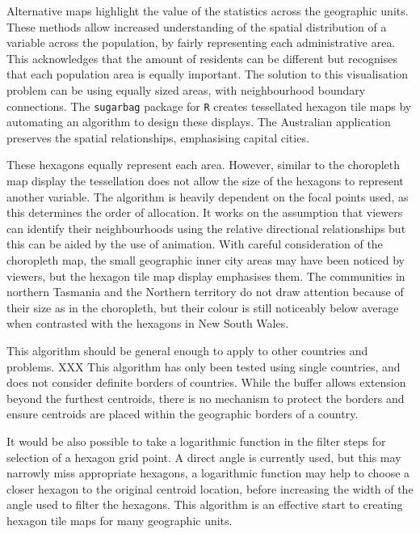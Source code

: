 Alternative maps highlight the value of the statistics across the
geographic units. These methods allow increased understanding of the
spatial distribution of a variable across the population, by fairly
representing each administrative area. This acknowledges that the amount
of residents can be different but recognises that each population area
is equally important. The solution to this visualisation problem can be
using equally sized areas, with neighbourhood boundary connections. The
\texttt{sugarbag} package for \texttt{R} creates tessellated hexagon
tile maps by automating an algorithm to design these displays. The
Australian application preserves the spatial relationships, emphasising
capital cities.

These hexagons equally represent each area. However, similar to the
choropleth map display the tessellation does not allow the size of the
hexagons to represent another variable. The algorithm is heavily
dependent on the focal points used, as this determines the order of
allocation. It works on the assumption that viewers can identify their
neighbourhoods using the relative directional relationships but this can
be aided by the use of animation. With careful consideration of the
choropleth map, the small geographic inner city areas may have been
noticed by viewers, but the hexagon tile map display emphasises them.
The communities in northern Tasmania and the Northern territory do not
draw attention because of their size as in the choropleth, but their
colour is still noticeably below average when contrasted with the
hexagons in New South Wales.

This algorithm should be general enough to apply to other countries and
problems. XXX This algorithm has only been tested using single
countries, and does not consider definite borders of countries. While
the buffer allows extension beyond the furthest centroids, there is no
mechanism to protect the borders and ensure centroids are placed within
the geographic borders of a country.

It would be also possible to take a logarithmic function in the filter
steps for selection of a hexagon grid point. A direct angle is currently
used, but this may narrowly miss appropriate hexagons, a logarithmic
function may help to choose a closer hexagon to the original centroid
location, before increasing the width of the angle used to filter the
hexagons. This algorithm is an effective start to creating hexagon tile
maps for many geographic units.



